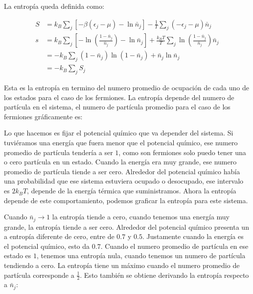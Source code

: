 \documentclass[11pt,fleqn]{book}
\begin{document}
La entropía queda definida como:

\begin{equation}
    \begin{split}
        S&=k_{B}\sum_{j}\left[-\beta(\epsilon_{j}-\mu)-\ln{\bar{n}_{j}}\right]-\frac{1}{T}\sum_{j}(-\epsilon_{j}-\mu)\bar{n}_{j}\\
        s&=k_{B}\sum_{j}\left[-\ln{\left(\frac{1-\bar{n}_{j}}{\bar{n}_{j}}\right)}-\ln{\bar{n}_{j}}\right]+\frac{k_{B}T}{T}\sum_{j}\ln{\left(\frac{1-\bar{n}_{j}}{\bar{n}_{j}}\right)}\bar{n}_{j}\\
        &=-k_{B}\sum_{j}(1-\bar{n}_{j})\ln{(1-\bar{n}_{j})}+\bar{n}_{j}\ln{\bar{n}_{j}}\\
        &=-k_{B}\sum_{j}S_{j}
    \end{split}
\end{equation}

Esta es la entropía en termino del numero promedio de ocupación de cada uno de los estados para el caso de los fermiones. La entropía depende del numero de partícula en el sistema, el numero de partícula promedio para el caso de los fermiones gráficamente es:


Lo que hacemos es fijar el potencial químico que va depender del sistema. Si tuviéramos una energía que fuera menor que el potencial químico, ese numero promedio de partícula tendería a ser $1$, como son fermiones solo puedo tener una o cero partícula en un estado. Cuando la energía era muy grande, ese numero promedio de partícula tiende a ser cero. Alrededor del potencial químico había una probabilidad que ese sistema estuviera ocupado o desocupado, ese intervalo es $2k_{B}T$, depende de la energía térmica que suministramos. Ahora la entropía depende de este comportamiento, podemos graficar la entropía para este sistema.


Cuando $\bar{n}_{j}\longrightarrow1$ la entropía tiende a cero, cuando tenemos una energía muy grande, la entropía tiende a ser cero. Alrededor del potencial químico presenta un a entropía diferente de cero, entre de $0.7$ y $0.5$. Justamente cuando la energía es el potencial químico, esto da $0.7$. Cuando el numero promedio de partícula en ese estado es $1$, tenemos una entropía nula, cuando tenemos un numero de partícula tendiendo a cero. La entropía tiene un máximo cuando el numero promedio de partícula corresponde a $\frac{1}{2}$. Esto también se obtiene derivando la entropía respecto a $\bar{n}_{j}$:
\end{document}
